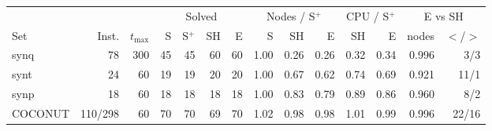\begin{tabular}{lrrrrrrrrrrrrr}
\toprule
 & & & \multicolumn{4}{c}{Solved} & \multicolumn{3}{c}{Nodes / S$^+$} & \multicolumn{2}{c}{CPU / S$^+$} & \multicolumn{2}{c}{E vs SH} \\
\cmidrule(lr){4-7}\cmidrule(lr){8-10}\cmidrule(lr){11-12}\cmidrule(lr){13-14}
Set & Inst. & $t_{\max}$ & S & S$^+$ & SH & E & S & SH & E & SH & E & nodes & $<$/$>$ \\
\midrule
synq & 78 & 300 & 45 & 45 & 60 & 60 & 1.00 & 0.26 & 0.26 & 0.32 & 0.34 & 0.996 & 3/3 \\
synt & 24 & 60 & 19 & 19 & 20 & 20 & 1.00 & 0.67 & 0.62 & 0.74 & 0.69 & 0.921 & 11/1 \\
synp & 18 & 60 & 18 & 18 & 18 & 18 & 1.00 & 0.83 & 0.79 & 0.89 & 0.86 & 0.960 & 8/2 \\
COCONUT & 110/298 & 60 & 70 & 70 & 69 & 70 & 1.02 & 0.98 & 0.98 & 1.01 & 0.99 & 0.996 & 22/16 \\
\bottomrule
\end{tabular}
